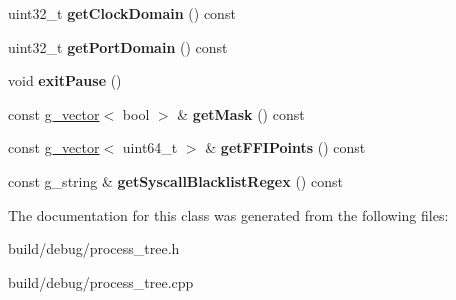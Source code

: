 \begin{DoxyCompactItemize}
\item 
\hypertarget{classProcessTreeNode_a6b4d0c0d7a099378856671c648da00a7}{uint32\-\_\-t {\bfseries get\-Clock\-Domain} () const }\label{classProcessTreeNode_a6b4d0c0d7a099378856671c648da00a7}

\item 
\hypertarget{classProcessTreeNode_a58bd8acdc55860dc78035b4b02a361cd}{uint32\-\_\-t {\bfseries get\-Port\-Domain} () const }\label{classProcessTreeNode_a58bd8acdc55860dc78035b4b02a361cd}

\item 
\hypertarget{classProcessTreeNode_a43f7a69a5782d826a93a139df2d2ef4d}{void {\bfseries exit\-Pause} ()}\label{classProcessTreeNode_a43f7a69a5782d826a93a139df2d2ef4d}

\item 
\hypertarget{classProcessTreeNode_aabd4c5d6d0999280747eda6333e0a8a1}{const \hyperlink{classg__vector}{g\-\_\-vector}$<$ bool $>$ \& {\bfseries get\-Mask} () const }\label{classProcessTreeNode_aabd4c5d6d0999280747eda6333e0a8a1}

\item 
\hypertarget{classProcessTreeNode_a74efcea43d5a091816035483cb98e8b7}{const \hyperlink{classg__vector}{g\-\_\-vector}$<$ uint64\-\_\-t $>$ \& {\bfseries get\-F\-F\-I\-Points} () const }\label{classProcessTreeNode_a74efcea43d5a091816035483cb98e8b7}

\item 
\hypertarget{classProcessTreeNode_a6c3b641be0e6727060ef2723fd2d8435}{const g\-\_\-string \& {\bfseries get\-Syscall\-Blacklist\-Regex} () const }\label{classProcessTreeNode_a6c3b641be0e6727060ef2723fd2d8435}

\end{DoxyCompactItemize}


The documentation for this class was generated from the following files\-:\begin{DoxyCompactItemize}
\item 
build/debug/process\-\_\-tree.\-h\item 
build/debug/process\-\_\-tree.\-cpp\end{DoxyCompactItemize}
